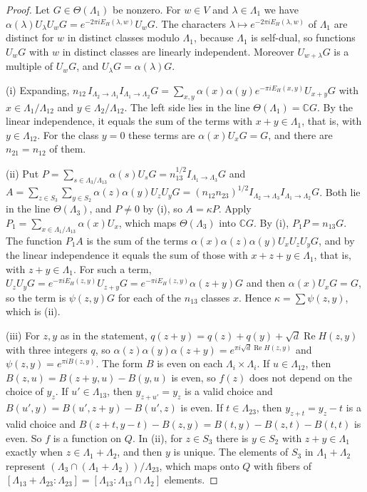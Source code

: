 \begin{proof}
Let $G\in\Theta(\Lambda_1)$ be nonzero. For $w\in V$ and $\lambda\in\Lambda_1$ we have $\alpha(\lambda)U_\lambda U_wG=e^{-2\pi iE_H(\lambda,w)}U_wG$. The characters $\lambda\mapsto e^{-2\pi iE_H(\lambda,w)}$ of $\Lambda_1$ are distinct for $w$ in distinct classes modulo $\Lambda_1$, because $\Lambda_1$ is self-dual, so functions $U_wG$ with $w$ in distinct classes are linearly independent. Moreover $U_{w+\lambda}G$ is a multiple of $U_wG$, and $U_\lambda G=\alpha(\lambda)G$.

(i) Expanding, $n_{12}\,I_{\Lambda_2\to\Lambda_1}I_{\Lambda_1\to\Lambda_2}G=\sum_{x,y}\alpha(x)\alpha(y)e^{-\pi iE_H(x,y)}U_{x+y}G$ with $x\in\Lambda_1/\Lambda_{12}$ and $y\in\Lambda_2/\Lambda_{12}$. The left side lies in the line $\Theta(\Lambda_1)=\mathbb CG$. By the linear independence, it equals the sum of the terms with $x+y\in\Lambda_1$, that is, with $y\in\Lambda_{12}$. For the class $y=0$ these terms are $\alpha(x)U_xG=G$, and there are $n_{21}=n_{12}$ of them.

(ii) Put $P=\sum_{s\in\Lambda_3/\Lambda_{13}}\alpha(s)U_sG=n_{13}^{1/2}I_{\Lambda_1\to\Lambda_3}G$ and $A=\sum_{z\in S_3}\sum_{y\in S_2}\alpha(z)\alpha(y)U_zU_yG=(n_{12}n_{23})^{1/2}I_{\Lambda_2\to\Lambda_3}I_{\Lambda_1\to\Lambda_2}G$. Both lie in the line $\Theta(\Lambda_3)$, and $P\ne0$ by (i), so $A=\kappa P$. Apply $P_1=\sum_{x\in\Lambda_1/\Lambda_{13}}\alpha(x)U_x$, which maps $\Theta(\Lambda_3)$ into $\mathbb CG$. By (i), $P_1P=n_{13}G$. The function $P_1A$ is the sum of the terms $\alpha(x)\alpha(z)\alpha(y)U_xU_zU_yG$, and by the linear independence it equals the sum of those with $x+z+y\in\Lambda_1$, that is, with $z+y\in\Lambda_1$. For such a term, $U_zU_yG=e^{-\pi iE_H(z,y)}U_{z+y}G=e^{-\pi iE_H(z,y)}\alpha(z+y)G$ and then $\alpha(x)U_xG=G$, so the term is $\psi(z,y)G$ for each of the $n_{13}$ classes $x$. Hence $\kappa=\sum\psi(z,y)$, which is (ii).

(iii) For $z,y$ as in the statement, $q(z+y)=q(z)+q(y)+\sqrt d\operatorname{Re}H(z,y)$ with three integers $q$, so $\alpha(z)\alpha(y)\alpha(z+y)=e^{\pi i\sqrt d\operatorname{Re}H(z,y)}$ and $\psi(z,y)=e^{\pi iB(z,y)}$. The form $B$ is even on each $\Lambda_i\times\Lambda_i$. If $u\in\Lambda_{12}$, then $B(z,u)=B(z+y,u)-B(y,u)$ is even, so $f(z)$ does not depend on the choice of $y_z$. If $u'\in\Lambda_{13}$, then $y_{z+u'}=y_z$ is a valid choice and $B(u',y)=B(u',z+y)-B(u',z)$ is even. If $t\in\Lambda_{23}$, then $y_{z+t}=y_z-t$ is a valid choice and $B(z+t,y-t)-B(z,y)=B(t,y)-B(z,t)-B(t,t)$ is even. So $f$ is a function on $Q$. In (ii), for $z\in S_3$ there is $y\in S_2$ with $z+y\in\Lambda_1$ exactly when $z\in\Lambda_1+\Lambda_2$, and then $y$ is unique. The elements of $S_3$ in $\Lambda_1+\Lambda_2$ represent $(\Lambda_3\cap(\Lambda_1+\Lambda_2))/\Lambda_{23}$, which maps onto $Q$ with fibers of $[\Lambda_{13}+\Lambda_{23}:\Lambda_{23}]=[\Lambda_{13}:\Lambda_{13}\cap\Lambda_2]$ elements.


\end{proof}
